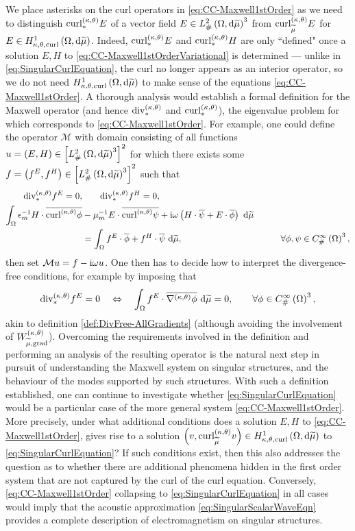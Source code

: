 We place asterisks on the curl operators in \eqref{eq:CC-Maxwell1stOrder} as we need to distinguish $\mathrm{curl}_{*}^{\left( \kappa, \theta \right)}E$ of a vector field $E\in L^2_{\#}\left( \Omega,\mathrm{d} \widetilde{\mu} \right)^3$ from $\mathrm{curl}_{\widetilde{\mu}}^{\left( \kappa, \theta \right)}E$ for $E\in H^1_{\kappa,\theta,\mathrm{curl}}\left( \Omega, \mathrm{d}\widetilde{\mu} \right)$.
Indeed, $\mathrm{curl}_{*}^{\left( \kappa, \theta \right)}E$ and $\mathrm{curl}_{*}^{\left( \kappa, \theta \right)}H$ are only ``defined" once a solution $E,H$ to \eqref{eq:CC-Maxwell1stOrderVariational} is determined --- unlike in \eqref{eq:SingularCurlEquation}, the curl no longer appears as an interior operator, so we do not need $H^1_{\kappa,\theta,\mathrm{curl}}\left( \Omega, \mathrm{d}\widetilde{\mu} \right)$ to make sense of the equations \eqref{eq:CC-Maxwell1stOrder}.
A thorough analysis would establish a formal definition for the Maxwell operator (and hence $\mathrm{div}_{*}^{\left( \kappa, \theta \right)}$ and $\mathrm{curl}_{*}^{\left( \kappa, \theta \right)}$), the eigenvalue problem for which corresponds to \eqref{eq:CC-Maxwell1stOrder}.
For example, one could define the operator $\mathcal{M}$ with domain consisting of all functions $u=\left( E,H \right)\in\left[ L^2_{\#}\left( \Omega,\mathrm{d} \widetilde{\mu} \right)^3 \right]^2$ for which there exists some $f=\left( f^E, f^H \right)\in\left[ L^2_{\#}\left( \Omega,\mathrm{d} \widetilde{\mu} \right)^3 \right]^2$ such that
\begin{align*}
	\mathrm{div}_{*}^{\left( \kappa, \theta \right)}f^E = 0, &\qquad
	\mathrm{div}_{*}^{\left( \kappa, \theta \right)}f^H = 0, & \\
	\int_{\Omega} \epsilon_m^{-1}H\cdot\overline{\mathrm{curl}_{}^{\left( \kappa, \theta \right)}\phi} &- \mu_m^{-1}E\cdot\overline{\mathrm{curl}_{}^{\left( \kappa, \theta \right)}\psi} + \mathrm{i}\omega\left( H\cdot\overline{\psi} + E\cdot\overline{\phi} \right)  \ \mathrm{d}\widetilde{\mu} & \\
	&= \int_{\Omega} f^E\cdot\overline{\phi} + f^H\cdot\overline{\psi}  \ \mathrm{d}\widetilde{\mu},
	&\qquad\forall \phi,\psi\in C^{\infty}_{\#}\left( \Omega \right)^3,
\end{align*}
then set $\mathcal{M}u = f - \mathrm{i}\omega u$.
One then has to decide how to interpret the divergence-free conditions, for example by imposing that
\begin{align*}
	\mathrm{div}_{*}^{\left( \kappa, \theta \right)}f^E = 0 \quad\Leftrightarrow\quad
	\int_{\Omega}f^E\cdot\overline{\nabla^{\left( \kappa, \theta \right)}\phi} \ \mathrm{d}\widetilde{\mu} = 0, 
	\qquad \forall \phi\in C^{\infty}_{\#}\left( \Omega \right)^3,
\end{align*}
akin to definition \ref{def:DivFree-AllGradients} (although avoiding the involvement of $W_{\widetilde{\mu},\mathrm{grad}}^{\left( \kappa, \theta \right)}$).
Overcoming the requirements involved in the definition and performing an analysis of the resulting operator is the natural next step in pursuit of understanding the Maxwell system on singular structures, and the behaviour of the modes supported by such structures.
With such a definition established, one can continue to investigate whether \eqref{eq:SingularCurlEquation} would be a particular case of the more general system \eqref{eq:CC-Maxwell1stOrder}.
More precisely, under what additional conditions does a solution $E,H$ to \eqref{eq:CC-Maxwell1stOrder}, gives rise to a solution $\left( v, \mathrm{curl}_{\widetilde{\mu}}^{\left( \kappa, \theta \right)}v  \right)\in H^1_{\kappa,\theta,\mathrm{curl}}\left( \Omega, \mathrm{d}\widetilde{\mu} \right)$ to \eqref{eq:SingularCurlEquation}?
If such conditions exist, then this also addresses the question as to whether there are additional phenomena hidden in the first order system that are not captured by the curl of the curl equation.
Conversely, \eqref{eq:CC-Maxwell1stOrder} collapsing to \eqref{eq:SingularCurlEquation} in all cases would imply that the acoustic approximation \eqref{eq:SingularScalarWaveEqn} provides a complete description of electromagnetism on singular structures.